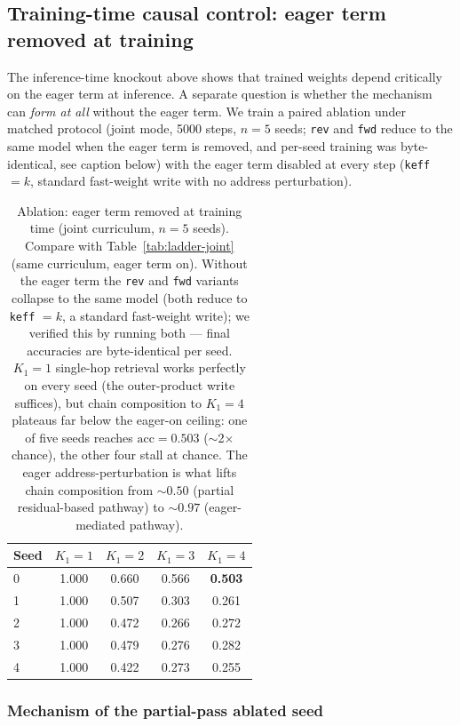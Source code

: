 \documentclass[11pt]{article}
\newcommand{\us}{\textunderscore}
\begin{document}
\subsection{Training-time causal control: eager term removed at training}
\label{sec:ablations:no-eager}

The inference-time knockout above shows that trained weights depend
critically on the eager term at inference. A separate question is
whether the mechanism can \emph{form at all} without the eager term.
We train a paired ablation under matched protocol (joint mode, 5000
steps, $n=5$ seeds; \texttt{rev} and \texttt{fwd} reduce to the same
model when the eager term is removed, and per-seed training was
byte-identical, see caption below) with the eager term disabled at
every step (\texttt{k\us{}eff} $= k$, standard fast-weight write with
no address perturbation).

\begin{table}[h]
\centering
\caption{Ablation: eager term removed at training time (joint curriculum,
$n=5$ seeds). Compare with Table~\ref{tab:ladder-joint} (same curriculum,
eager term on). Without the eager term the \texttt{rev} and \texttt{fwd}
variants collapse to the same model (both reduce to
\texttt{k\us{}eff} $= k$, a standard fast-weight write); we verified
this by running both --- final accuracies are byte-identical per seed.
$K_1{=}1$ single-hop retrieval works perfectly on every seed
(the outer-product write suffices), but chain composition to $K_1{=}4$
plateaus far below the eager-on ceiling: one of five seeds reaches
$\text{acc} = 0.503$ ($\sim$2$\times$ chance), the other four stall at
chance. The eager address-perturbation is what lifts chain composition
from $\sim$$0.50$ (partial residual-based pathway) to $\sim$$0.97$
(eager-mediated pathway).}
\label{tab:no-eager}
\begin{tabular}{lcccc}
\toprule
Seed & $K_1 = 1$ & $K_1 = 2$ & $K_1 = 3$ & $K_1 = 4$ \\
\midrule
0 & 1.000 & 0.660 & 0.566 & \textbf{0.503} \\
1 & 1.000 & 0.507 & 0.303 & 0.261 \\
2 & 1.000 & 0.472 & 0.266 & 0.272 \\
3 & 1.000 & 0.479 & 0.276 & 0.282 \\
4 & 1.000 & 0.422 & 0.273 & 0.255 \\
\bottomrule
\end{tabular}
\end{table}

\subsubsection*{Mechanism of the partial-pass ablated seed}
\end{document}
